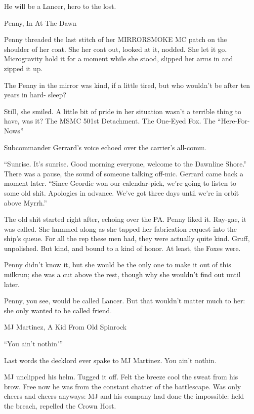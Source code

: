 He will be a Lancer, hero to the lost.    

Penny, In At The Dawn  

Penny threaded the last stitch of her MIRRORSMOKE MC patch on the shoulder of her coat. She  
her coat out, looked at it, nodded. She let it go. Microgravity hold it for a moment while she stood,  
slipped her arms in and zipped it up.   

                                                                                                             


The Penny in the mirror was kind, if a little tired, but who wouldn’t be after ten years in hard- 
sleep?  

Still, she smiled. A little bit of pride in her situation wasn’t a terrible thing to have, was it? The  
MSMC 501st Detachment. The One-Eyed Fox. The “Here-For-Nows”   

Subcommander Gerrard’s voice echoed over the carrier’s all-comm.   

“Sunrise. It’s sunrise. Good morning everyone, welcome to the Dawnline Shore.” There was a  
pause, the sound of someone talking off-mic. Gerrard came back a moment later. “Since Geordie  
won our calendar-pick, we’re going to listen to some old shit. Apologies in advance. We’ve got  
three days until we’re in orbit above Myrrh.”  

The old shit started right after, echoing over the PA. Penny liked it. Ray-gae, it was called. She  
hummed along as she tapped her fabrication request into the ship’s queue. For all the rep these  
men had, they were actually quite kind. Gruff, unpolished. But kind, and bound to a kind of honor.  
At least, the Foxes were.   

Penny didn’t know it, but she would be the only one to make it out of this milkrun; she was a cut  
above the rest, though why she wouldn’t find out until later.   

Penny, you see, would be called Lancer. But that wouldn’t matter much to her: she only wanted to  
be called friend.   

MJ Martinez, A Kid From Old Spinrock  

“You ain’t nothin’”   

Last words the decklord ever spake to MJ Martinez. You ain’t nothin.   

MJ unclipped his helm. Tugged it off. Felt the breeze cool the sweat from his brow. Free now he  
was from the constant chatter of the battlescape. Was only cheers and cheers anyways: MJ and  
his company had done the impossible: held the breach, repelled the Crown Host.  

